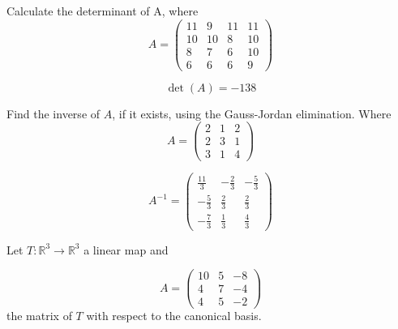 \begin{questions}

\question Calculate the determinant of A, where
$$
A=\left(\begin{array}{rrrr}
11 & 9 & 11 & 11 \\
10 & 10 & 8 & 10 \\
8 & 7 & 6 & 10 \\
6 & 6 & 6 & 9
\end{array}\right)
$$

\begin{solution}
$$\det(A)=-138$$
\end{solution}

\question Find the inverse of $A$, if it exists, using the Gauss-Jordan elimination. Where
$$
A=\left(\begin{array}{rrr}
2 & 1 & 2 \\
2 & 3 & 1 \\
3 & 1 & 4
\end{array}\right)
$$

\begin{solution}
$$A^{-1}=\left(\begin{array}{rrr}
\frac{11}{3} & -\frac{2}{3} & -\frac{5}{3} \\
-\frac{5}{3} & \frac{2}{3} & \frac{2}{3} \\
-\frac{7}{3} & \frac{1}{3} & \frac{4}{3}
\end{array}\right)$$
\end{solution}

\question Let $T:\mathbb{R}^3\rightarrow\mathbb{R}^3$  a linear map and
 
$$
A=\left(\begin{array}{rrr}
10 & 5 & -8 \\
4 & 7 & -4 \\
4 & 5 & -2
\end{array}\right)
$$
the matrix of $T$ with respect to the canonical basis.
\end{questions}
